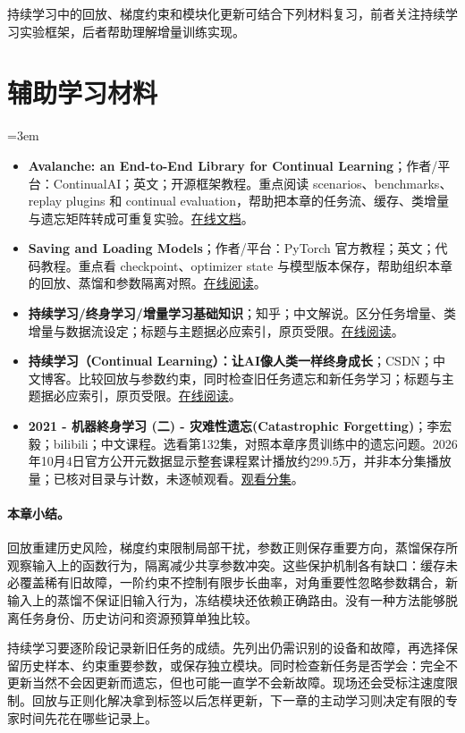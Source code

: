 持续学习中的回放、梯度约束和模块化更新可结合下列材料复习，前者关注持续学习实验框架，后者帮助理解增量训练实现。
\section*{辅助学习材料}
\begingroup
\emergencystretch=3em
\begin{itemize}
\item \textbf{Avalanche: an End-to-End Library for Continual Learning}；作者/平台：ContinualAI；英文；开源框架教程。重点阅读 scenarios、benchmarks、replay plugins 和 continual evaluation，帮助把本章的任务流、缓存、类增量与遗忘矩阵转成可重复实验。\href{https://avalanche.continualai.org/}{在线文档}。
\item \textbf{Saving and Loading Models}；作者/平台：PyTorch 官方教程；英文；代码教程。重点看 checkpoint、optimizer state 与模型版本保存，帮助组织本章的回放、蒸馏和参数隔离对照。\href{https://docs.pytorch.org/tutorials/beginner/saving\_loading\_models.html}{在线阅读}。
\item \textbf{持续学习/终身学习/增量学习基础知识}；知乎；中文解说。区分任务增量、类增量与数据流设定；标题与主题据必应索引，原页受限。\href{https://zhuanlan.zhihu.com/p/696297033}{在线阅读}。
\item \textbf{持续学习（Continual Learning）：让AI像人类一样终身成长}；CSDN；中文博客。比较回放与参数约束，同时检查旧任务遗忘和新任务学习；标题与主题据必应索引，原页受限。\href{https://blog.csdn.net/daqianai/article/details/152846877}{在线阅读}。
\item \textbf{2021 - 机器終身学习 (二) - 灾难性遗忘(Catastrophic Forgetting)}；李宏毅；bilibili；中文课程。选看第132集，对照本章序贯训练中的遗忘问题。2026年10月4日官方公开元数据显示整套课程累计播放约299.5万，并非本分集播放量；已核对目录与计数，未逐帧观看。\href{https://www.bilibili.com/video/BV1Wv411h7kN/?p=132}{观看分集}。
\end{itemize}
\endgroup
\paragraph{本章小结。}
回放重建历史风险，梯度约束限制局部干扰，参数正则保存重要方向，蒸馏保存所观察输入上的函数行为，隔离减少共享参数冲突。这些保护机制各有缺口：缓存未必覆盖稀有旧故障，一阶约束不控制有限步长曲率，对角重要性忽略参数耦合，新输入上的蒸馏不保证旧输入行为，冻结模块还依赖正确路由。没有一种方法能够脱离任务身份、历史访问和资源预算单独比较。

持续学习要逐阶段记录新旧任务的成绩。先列出仍需识别的设备和故障，再选择保留历史样本、约束重要参数，或保存独立模块。同时检查新任务是否学会：完全不更新当然不会因更新而遗忘，但也可能一直学不会新故障。现场还会受标注速度限制。回放与正则化解决拿到标签以后怎样更新，下一章的主动学习则决定有限的专家时间先花在哪些记录上。
